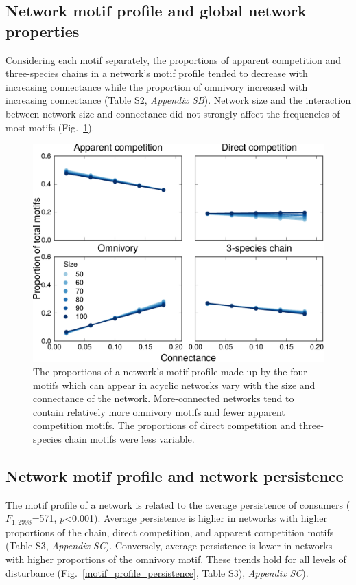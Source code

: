 \documentclass[12pt]{article}
\begin{document}
\begin{spacing}{2.0}
    \subsection*{Network motif profile and global network properties}

        Considering each motif separately, the proportions of apparent competition and three-species chains in a network's motif profile tended to decrease with increasing connectance while the proportion of omnivory increased with increasing connectance (Table S2, \emph{Appendix SB}). Network size and the interaction between network size and connectance did not strongly affect the frequencies of most motifs (Fig.~\ref{motif_proportion_lms}).

        \begin{figure}[h!]
            \centering
            \includegraphics[width=.75\textwidth]{manuscript/figures/motif_proportion_lms.pdf}
            \caption{The proportions of a network's motif profile made up by the four motifs which can appear in acyclic networks vary with the size and connectance of the network. More-connected networks tend to contain relatively more omnivory motifs and fewer apparent competition motifs. The proportions of direct competition and three-species chain motifs were less variable.}
            \label{motif_proportion_lms}
        \end{figure}

    \clearpage

    \subsection*{Network motif profile and network persistence}
    
        The motif profile of a network is related to the average persistence of consumers ($F_{1,2998}$=571, $p$\textless0.001). Average persistence is higher in networks with higher proportions of the chain, direct competition, and apparent competition motifs (Table S3, \emph{Appendix SC}). Conversely, average persistence is lower in networks with higher proportions of the omnivory motif. These trends hold for all levels of disturbance (Fig.~\ref{motif_profile_persistence}, Table S3), \emph{Appendix SC}).%


\end{spacing}
\end{document}
